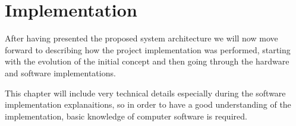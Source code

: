 \chapter{Implementation} \label{chap:impl}

After having presented the proposed system architecture we will now move forward to describing how the project implementation was performed, starting with the evolution of the initial concept and then going through the hardware and software implementations.

This chapter will include very technical details especially during the software implementation explanaitions, so in order to have a good understanding of the implementation, basic knowledge of computer software is required.













